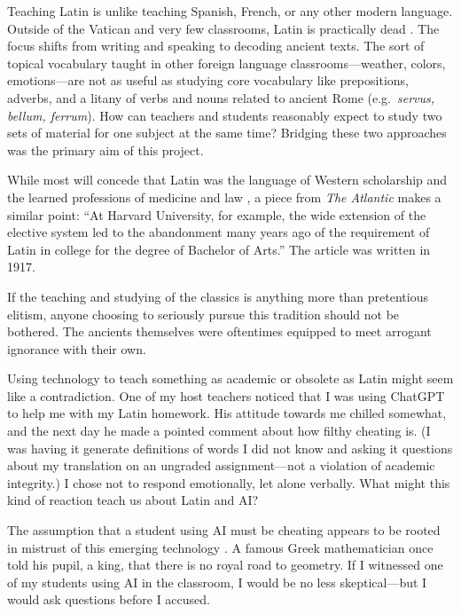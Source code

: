 \documentclass[11pt, a4paper]{article}
\begin{document}
Teaching Latin is unlike teaching Spanish, French, or any other modern
language. Outside of the Vatican and very few classrooms, Latin is
practically dead \autocite{Beard2013}. The focus shifts from writing and
speaking to decoding ancient texts. The sort of topical vocabulary taught in
other foreign language classrooms---weather, colors, emotions---are not as
useful as studying core vocabulary like prepositions, adverbs, and a litany
of verbs and nouns related to ancient Rome (e.g.\ \textit{servus, bellum,
ferrum}). How can teachers and students reasonably expect to study two sets
of material for one subject at the same time? Bridging these two approaches
was the primary aim of this project.

While most will concede that Latin was the language of Western scholarship
and the learned professions of medicine and law \autocite{Waquet2001}, a
piece from \textit{The Atlantic} makes a similar point: ``At Harvard
University, for example, the wide extension of the elective system led to
the abandonment many years ago of the requirement of Latin in college for
the degree of Bachelor of Arts.'' The article was written in 1917.

If the teaching and studying of the classics is anything more than
pretentious elitism, anyone choosing to seriously pursue this tradition
should not be bothered. The ancients themselves were oftentimes equipped to
meet arrogant ignorance with their own.

Using technology to teach something as academic or obsolete as Latin might
seem like a contradiction. One of my host teachers noticed that I was using
ChatGPT to help me with my Latin homework. His attitude towards me chilled
somewhat, and the next day he made a pointed comment about how filthy
cheating is. (I was having it generate definitions of words I did not know
and asking it questions about my translation on an ungraded assignment---not
a violation of academic integrity.) I chose not to respond emotionally, let
alone verbally. What might this kind of reaction teach us about Latin and AI?

The assumption that a student using AI must be cheating appears to be rooted
in mistrust of this emerging technology \autocite{Lim2023}. A famous Greek
mathematician once told his pupil, a king, that there is no royal road to
geometry. If I witnessed one of my students using AI in the classroom, I
would be no less skeptical---but I would ask questions before I accused.

\end{document}
